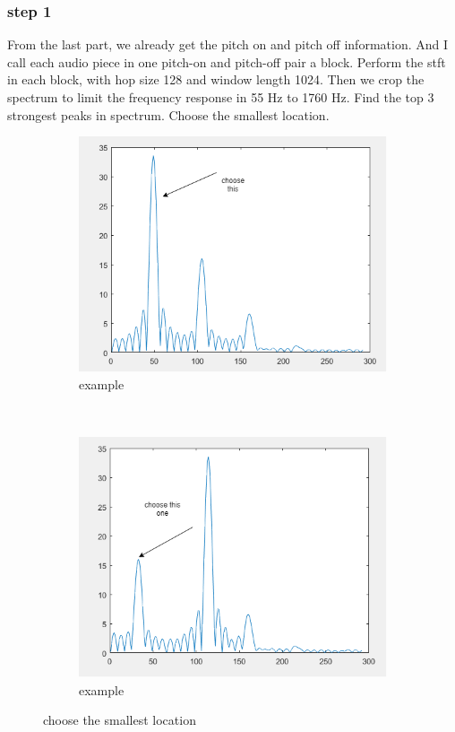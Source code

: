 \documentclass[twoside]{article}
\begin{document}
\subsubsection{step 1}
From the last part, we already get the pitch on and pitch off information. And I call each audio piece in one pitch-on and pitch-off pair a block. Perform the stft in each block, with hop size 128 and window length 1024. Then we crop the spectrum to limit the frequency response in 55 Hz to 1760 Hz. Find the top 3 strongest peaks in spectrum. Choose the smallest location.\\

\begin{figure}[H]
    \centering
    \begin{subfigure}[b]{0.45\textwidth}
        \includegraphics[width=\textwidth]{freqchoose.png}
        \caption{example}
    \end{subfigure}
    ~ %
    \begin{subfigure}[b]{0.45\textwidth}
        \includegraphics[width=\textwidth]{freqchoose2.png}
        \caption{example}
    \end{subfigure}
    \caption{choose the smallest location}
\end{figure}
\end{document}

